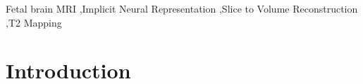 \documentclass[preprint,authoryear,12pt]{elsarticle}
\begin{document}
\begin{frontmatter}

\begin{keyword}
Fetal brain MRI \sep Implicit Neural Representation \sep Slice to Volume Reconstruction  \sep T2 Mapping 



\end{keyword}

\end{frontmatter}



\section{Introduction}
\label{sec1}
\end{document}
